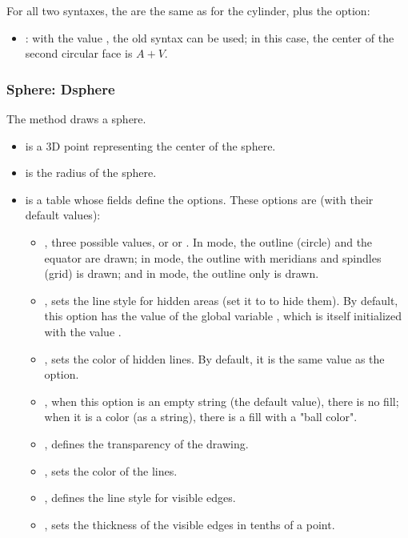 For all two syntaxes, the  are the same as for the cylinder, plus the option:
\begin{itemize}
    \item {}: with the value \true, the old syntax  can be used; in this case, the center of the second circular face is $A+V$.
\end{itemize}

\subsubsection{Sphere: Dsphere}

The  method draws a sphere.

\begin{itemize}
    \item {} is a 3D point representing the center of the sphere.
    \item {} is the radius of the sphere.
    \item {} is a table whose fields define the options. These options are (with their default values):
\begin{itemize}
    \item {}, three possible values,  or  or . In  mode, the outline (circle) and the equator are drawn; in  mode, the outline with meridians and spindles (grid) is drawn; and in  mode, the outline only is drawn.

    \item {}, sets the line style for hidden areas (set it to  to hide them). By default, this option has the value of the global variable , which is itself initialized with the value .

    \item {}, sets the color of hidden lines. By default, it is the same value as the  option.

    \item {}, when this option is an empty string (the default value), there is no fill; when it is a color (as a string), there is a fill with a "ball color".

    \item {}, defines the transparency of the drawing.
    
    \item {}, sets the color of the lines.    

    \item {}, defines the line style for visible edges.

    \item {}, sets the thickness of the visible edges in tenths of a point.
\end{itemize}
\end{itemize}

